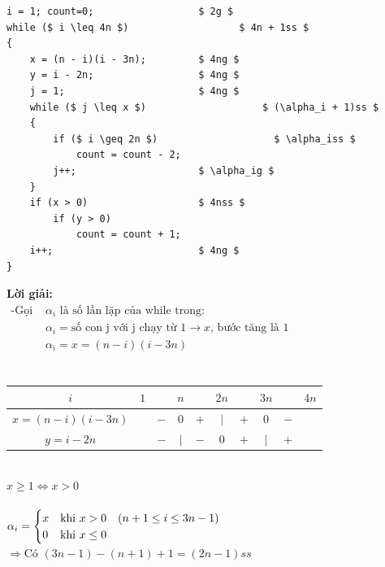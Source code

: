 \documentclass[12pt, letterpaper]{article}
\begin{document}
\begin{lstlisting}
i = 1; count=0;                  $ 2g $
while ($ i \leq 4n $)           		$ 4n + 1ss $
{
    x = (n - i)(i - 3n);         $ 4ng $
    y = i - 2n;                  $ 4ng $
    j = 1;                       $ 4ng $
    while ($ j \leq x $)                    $ (\alpha_i + 1)ss $
    {
        if ($ i \geq 2n $)                    $ \alpha_iss $
            count = count - 2;
        j++;                     $ \alpha_ig $
    }
    if (x > 0)                   $ 4nss $
        if (y > 0)
            count = count + 1;
    i++;                         $ 4ng $
}
\end{lstlisting}
\textbf{Lời giải:} \\
$ \begin{aligned}
    \text{-Gọi } & \alpha_i \text{ là số lần lặp của while trong:}                              \\
                & \alpha_i = \text{số con j với j chạy từ 1} \rightarrow x \text{, bước tăng là 1} \\
                & \alpha_i = x = (n-i)(i-3n) \\
\end{aligned} $ \\
 \\
\begin{table}[htb]
    \begin{tabular}{c|c c c c c c c c c}
        $i$ & $1$ &  & $n$ &  & $2n$ &  & $3n$  & & $4n$\\
        \hline
        $x = (n-i)(i-3n)$ &  & $-$ & $0$ & $+$ & $\vert$ & $+$ & $0$ & $-$\\
        \hline
        $y = i - 2n$ &  & $-$ & $\vert$ & $-$ & $0$ & $+$ & $\vert$ & $+$\\
    \end{tabular}
\end{table} \\
 $x \geq 1 \Leftrightarrow x > 0$ \\ \\
$\alpha_i =
\begin{cases}
x &\text{khi } x>0 \quad (n + 1 \leq i \leq 3n - 1)\\
0 &\text{khi } x\leq 0
\end{cases} \\$
 \\
$\Rightarrow \text{Có } (3n - 1) - (n + 1) + 1 = (2n - 1)ss$ \\
\end{document}
